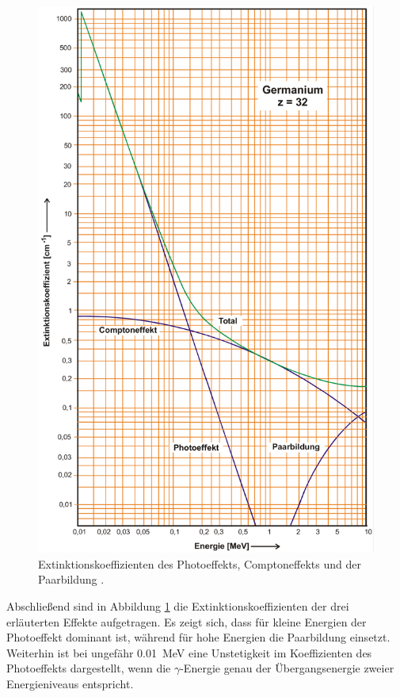 \begin{figure}
	\centering
	\includegraphics[width=.9\textwidth]{images/Wirkungsquerschnitte-gesamt.pdf}
	\caption{Extinktionskoeffizienten des Photoeffekts, Comptoneffekts und der Paarbildung \cite[9]{anleitung}.}
	\label{fig:Wirkungsquerschnitte-gesamt}
\end{figure}
Abschließend sind in Abbildung \ref{fig:Wirkungsquerschnitte-gesamt} die Extinktionskoeffizienten
der drei erläuterten Effekte aufgetragen. Es zeigt sich, dass für kleine Energien der Photoeffekt
dominant ist, während für hohe Energien die Paarbildung einsetzt.
Weiterhin ist bei ungefähr \SI{0.01}{\mega\electronvolt} eine Unstetigkeit im Koeffizienten des
Photoeffekts dargestellt, wenn die $\gamma$-Energie genau der Übergangsenergie zweier
Energieniveaus entspricht.

